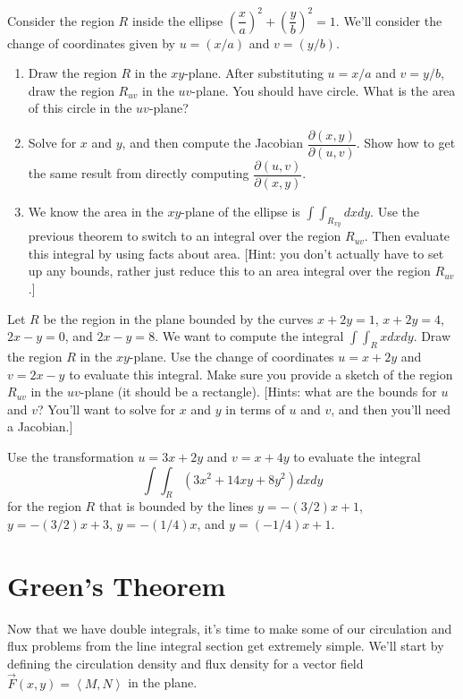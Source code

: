 \begin{problem}
 Consider the region $R$ inside the ellipse $\left(\dfrac{x}{a}\right)^2+\left(\dfrac{y}{b}\right)^2=1$.  We'll consider the change of coordinates given by $u=(x/a)$ and $v=(y/b)$.
\begin{enumerate}
 \item Draw the region $R$ in the $xy$-plane.  After substituting $u=x/a$ and $v=y/b$, draw the region $R_{uv}$ in the $uv$-plane.  You should have circle.  What is the area of this circle in the $uv$-plane?
 \item Solve for $x$ and $y$, and then compute the Jacobian  $\dfrac{\partial (x,y)}{\partial (u,v)}$. Show how to get the same result from directly computing $\dfrac{\partial (u,v)}{\partial (x,y)}$.
 \item We know the area in the $xy$-plane of the ellipse is $\int\int_{R_{xy}} dxdy$. Use the previous theorem to switch to an integral over the region $R_{uv}$.  Then evaluate this integral by using facts about area. [Hint: you don't actually have to set up any bounds, rather just reduce this to an area integral over the region $R_{uv}$.] 
\end{enumerate}

\end{problem}


\begin{problem}
Let $R$ be the region in the plane bounded by the curves $x+2y=1$, $x+2y=4$, $2x-y=0$, and $2x-y=8$.  We want to compute the integral $\int\int_R xdxdy$. Draw the region $R$ in the $xy$-plane. Use the change of coordinates $u=x+2y$ and $v=2x-y$ to evaluate this integral. Make sure you provide a sketch of the region $R_{uv}$ in the $uv$-plane (it should be a rectangle).  
[Hints: what are the bounds for $u$ and $v$?  You'll want to solve for $x$ and $y$ in terms of $u$ and $v$, and then you'll need a Jacobian.]
\end{problem}


\begin{problem}
 Use the transformation $u=3x+2y$ and $v=x+4y$ to evaluate the integral $$\int\int_R (3x^2+14xy+8y^2)dxdy$$ for the region $R$ that is bounded by the lines $y=-(3/2)x+1$, $y=-(3/2)x+3$, $y=-(1/4)x$, and  $y=(-1/4)x+1$.
\end{problem}

\section{Green's Theorem}
Now that we have double integrals, it's time to make some of our circulation and flux problems from the line integral section get extremely simple. We'll start by defining the circulation density and flux density for a vector field $\vec F(x,y)=\left<M,N\right>$ in the plane.

